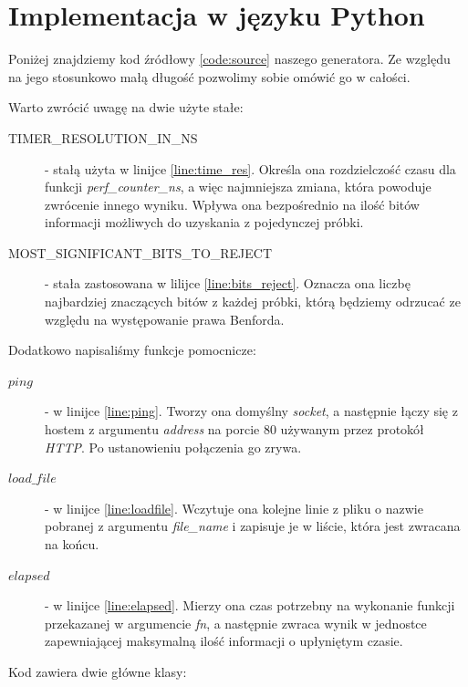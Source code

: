 \section{Implementacja w języku Python}
Poniżej znajdziemy kod źródłowy \ref{code:source} naszego generatora. Ze względu na jego stosunkowo małą długość pozwolimy sobie omówić go w całości.
\begin{small}

\end{small}
Warto zwrócić uwagę na dwie użyte stałe:
\begin{description}
\item[TIMER\_RESOLUTION\_IN\_NS] - stałą użyta w linijce \ref{line:time_res}. Określa ona rozdzielczość czasu dla funkcji \emph{perf\_counter\_ns}, a więc najmniejsza zmiana, która powoduje zwrócenie innego wyniku. Wpływa ona bezpośrednio na ilość bitów informacji możliwych do uzyskania z pojedynczej próbki.
\item[MOST\_SIGNIFICANT\_BITS\_TO\_REJECT] - stała zastosowana w lilijce \ref{line:bits_reject}. Oznacza ona liczbę najbardziej znaczących bitów z każdej próbki, którą będziemy odrzucać ze względu na występowanie prawa Benforda.
\end{description}
Dodatkowo napisaliśmy funkcje pomocnicze:
\begin{description}
\item[$ping$] -  w linijce \ref{line:ping}. Tworzy ona domyślny \textit{socket}, a następnie łączy się z hostem z argumentu \emph{address} na porcie 80 używanym przez protokół \emph{HTTP}. Po ustanowieniu połączenia go zrywa.
\item[$load\_file$] - w linijce \ref{line:loadfile}. Wczytuje ona kolejne linie z pliku o nazwie pobranej z argumentu \emph{file\_name} i zapisuje je w liście, która jest zwracana na końcu.
\item[$elapsed$] - w linijce \ref{line:elapsed}. Mierzy ona czas potrzebny na wykonanie funkcji przekazanej w argumencie \emph{fn}, a następnie zwraca wynik w jednostce zapewniającej maksymalną ilość informacji o upłyniętym czasie.
\end{description}
Kod zawiera dwie główne klasy:
